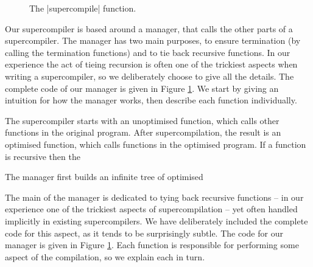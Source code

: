 \documentclass{sigplanconf}
\begin{document}
\begin{figure}
\caption{The |supercompile| function.}
\label{fig:manager}
\end{figure}

Our supercompiler is based around a manager, that calls the other parts of a supercompiler. The manager has two main purposes, to ensure termination (by calling the termination functions) and to tie back recursive functions. In our experience the act of tieing recursion is often one of the trickiest aspects when writing a supercompiler, so we deliberately choose to give all the details. The complete code of our manager is given in Figure \ref{fig:manager}. We start by giving an intuition for how the manager works, then describe each function individually.

The supercompiler starts with an unoptimised function, which calls other functions in the original program. After supercompilation, the result is an optimised function, which calls functions in the optimised program. If a function is recursive then the 

The manager first builds an infinite tree of optimised 




The main  of the manager is dedicated to tying back recursive functions -- in our experience one of the trickiest aspects of supercompilation -- yet often handled implicitly in existing supercompilers. We have deliberately included the complete code for this aspect, as it tends to be surprisingly subtle. The code for our manager is given in Figure \ref{fig:manager}. Each function is responsible for performing some aspect of the compilation, so we explain each in turn.
\end{document}
